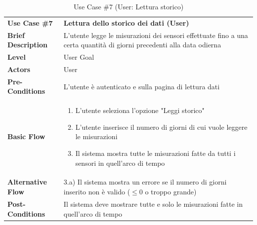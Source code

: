 	\begin{table}[h]
	\centering
	\setlength{\arrayrulewidth}{0.8pt} %
	
	\begin{tabular}{|l p{12cm}|}
		\hline
		
		\rowcolor{gray!25}
		\textbf{Use Case \#7} & \textbf{Lettura dello storico dei dati (User)} \\ 
		\textbf{Brief Description} & L'utente legge le misurazioni dei sensori effettuate fino a una certa quantità di giorni precedenti alla data odierna \\
		\textbf{Level} & User Goal \\ 
		\textbf{Actors} & User \\ 
		\textbf{Pre-Conditions} & L'utente è autenticato e sulla pagina di lettura dati \\ 
		\textbf{Basic Flow} & \begin{enumerate}[label=\arabic*), leftmargin=*, before=\vspace{-0.7cm}, after=\vspace{-0.4cm}]
			\item L'utente seleziona l'opzione "Leggi storico"
			\item L'utente inserisce il numero di giorni di cui vuole leggere le misurazioni 
			\item Il sistema mostra tutte le misurazioni fatte da tutti i sensori in quell'arco di tempo
		\end{enumerate} \\   
		\textbf{Alternative Flow} & 3.a) Il sistema mostra un errore se il numero di giorni inserito non è valido ($\le$0 o troppo grande) \\ 
		\textbf{Post-Conditions} & Il sistema deve mostrare tutte e solo le misurazioni fatte in quell'arco di tempo \\ 
		
		\hline
	\end{tabular}
	
	\vspace{0.2cm}
	\caption{Use Case \#7 (User: Lettura storico)}
	\end{table}
	\vspace{1cm} 
	
